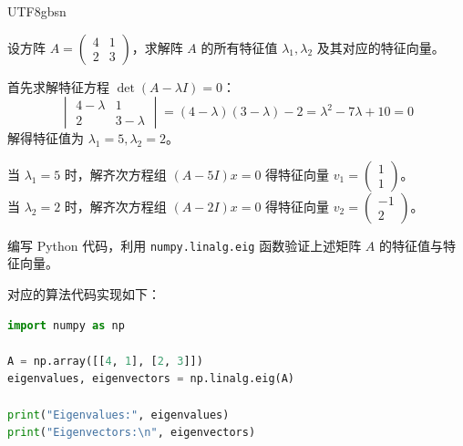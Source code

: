 \documentclass[mode=worksheet, palette=amethyst, lang=chinese, showsolutions=true, fontsize=11pt]{modernclassnotes}
\begin{document}
\ifxetex\else\begin{CJK*}{UTF8}{gbsn}\fi

\maketitle

\begin{exercise}[特征值与特征向量计算]
设方阵 $A = \begin{pmatrix} 4 & 1 \\ 2 & 3 \end{pmatrix}$，求解阵 $A$ 的所有特征值 $\lambda_1, \lambda_2$ 及其对应的特征向量。
\end{exercise}

\begin{solution}
首先求解特征方程 $\det(A - \lambda I) = 0$：
\begin{equation*}
  \begin{vmatrix} 4-\lambda & 1 \\ 2 & 3-\lambda \end{vmatrix} = (4-\lambda)(3-\lambda) - 2 = \lambda^2 - 7\lambda + 10 = 0
\end{equation*}
解得特征值为 $\lambda_1 = 5, \lambda_2 = 2$。

当 $\lambda_1 = 5$ 时，解齐次方程组 $(A - 5I)x = 0$ 得特征向量 $v_1 = \begin{pmatrix} 1 \\ 1 \end{pmatrix}$。\\
当 $\lambda_2 = 2$ 时，解齐次方程组 $(A - 2I)x = 0$ 得特征向量 $v_2 = \begin{pmatrix} -1 \\ 2 \end{pmatrix}$。
\end{solution}

\begin{exercise}
编写 Python 代码，利用 \texttt{numpy.linalg.eig} 函数验证上述矩阵 $A$ 的特征值与特征向量。
\end{exercise}

\begin{solution}
对应的算法代码实现如下：
\end{solution}

\begin{codebox}
\begin{lstlisting}[language=Python]
import numpy as np

A = np.array([[4, 1], [2, 3]])
eigenvalues, eigenvectors = np.linalg.eig(A)

print("Eigenvalues:", eigenvalues)
print("Eigenvectors:\n", eigenvectors)
\end{lstlisting}
\end{codebox}

\ifxetex\else\end{CJK*}\fi
\end{document}
